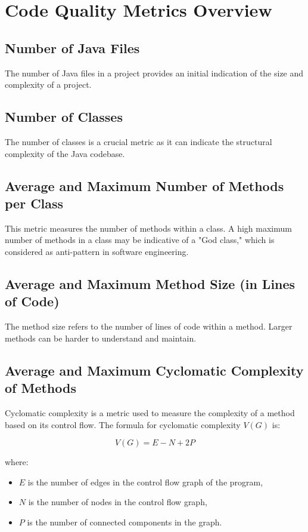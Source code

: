 \documentclass[12pt]{article}
\begin{document}
\section{Code Quality Metrics Overview}
\subsection{Number of Java Files}
The number of Java files in a project provides an initial indication of the size and complexity of a project.


\subsection{Number of Classes}
The number of classes is a crucial metric as it can indicate the structural complexity of the Java codebase.

\subsection{Average and Maximum Number of Methods per Class}
This metric measures the number of methods within a class.  A high maximum number of methods in a class may be indicative of a "God class," which is considered as anti-pattern in software engineering.

\subsection{Average and Maximum Method Size (in Lines of Code)}
The method size refers to the number of lines of code within a method. Larger methods can be harder to understand and maintain. 

\subsection{Average and Maximum Cyclomatic Complexity of Methods}
Cyclomatic complexity is a metric used to measure the complexity of a method based on its control flow. The formula for cyclomatic complexity \( V(G) \) is:

\[
V(G) = E - N + 2P
\]

where:
\begin{itemize}
    \item \( E \) is the number of edges in the control flow graph of the program,
    \item \( N \) is the number of nodes in the control flow graph,
    \item \( P \) is the number of connected components in the graph.

\end{itemize}
\end{document}
